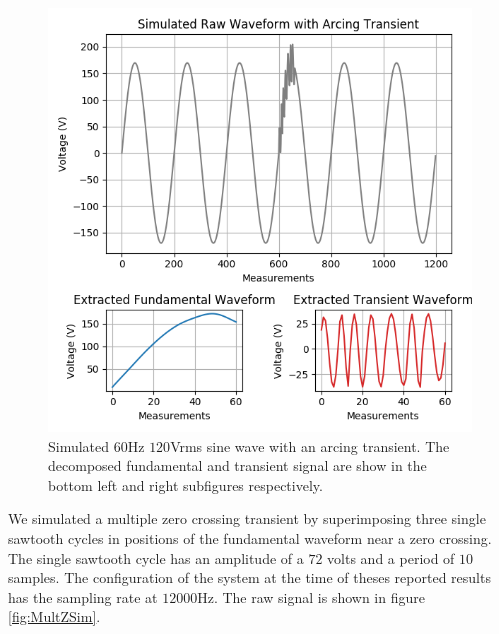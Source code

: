 \documentclass[10pt, conference, compsocconf]{IEEEtran}
\begin{document}
\begin{figure}[ht]
\centering%
\includegraphics[scale=0.35]{./figures/arcing_sim.png}
\caption{Simulated $60$Hz $120$Vrms sine wave with an arcing transient. The decomposed fundamental and transient signal are show in the bottom left and right subfigures respectively.}\label{fig:ArcingSim}
\end{figure}


We simulated a multiple zero crossing transient by superimposing three single sawtooth cycles in positions of the fundamental waveform near a zero crossing. The single sawtooth cycle has an amplitude of a $72$ volts and a period of $10$ samples. The configuration of the system at the time of theses reported results has the sampling rate at $12000$Hz. The raw signal is shown in figure \ref{fig:MultZSim}.
\end{document}
